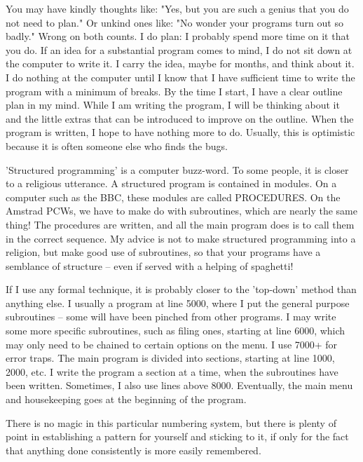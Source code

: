 You may have kindly thoughts like: "Yes, but you are such a genius that you do 
not  need to plan." Or unkind ones like: "No wonder your programs turn out  so 
badly." Wrong on both counts. I do plan: I probably spend more time on it that 
you do. If an idea for a substantial program comes to mind, I do not sit  down 
at  the  computer to write it. I carry the idea, maybe for months,  and  think 
about  it.  I do nothing at the computer until I know that I  have  sufficient 
time  to  write the program with a minimum of breaks. By the time I  start,  I 
have  a clear outline plan in my mind. While I am writing the program, I  will 
be  thinking about it and the little extras that can be introduced to  improve 
on  the outline. When the program is written, I hope to have nothing  more  to 
do. Usually, this is optimistic because it is often someone else who finds the 
bugs.

'Structured programming' is a computer buzz-word. To some people, it is closer 
to  a religious utterance. A structured program is contained in modules. On  a 
computer such as the BBC, these modules are called PROCEDURES. On the  Amstrad 
PCWs,  we have to make do with subroutines, which are nearly the  same  thing! 
The  procedures are written, and all the main program does is to call them  in 
the  correct sequence. My advice is not to make structured programming into  a 
religion,  but  make  good use of subroutines, so that your  programs  have  a 
semblance of structure -- even if served with a helping of spaghetti!

If I use any formal technique, it is probably closer to the 'top-down'  method 
than anything else. I usually a program at line 5000, where I put the  general 
purpose subroutines -- some will have been pinched from other programs. I  may 
write  some more specific subroutines, such as filing ones, starting  at  line 
6000, which may only need to be chained to certain options on the menu. I  use 
7000+ for error traps. The main program is divided into sections, starting  at 
line  1000,  2000,  etc. I write the program a section at  a  time,  when  the 
subroutines  have  been  written.  Sometimes, I also  use  lines  above  8000. 
Eventually,  the  main  menu and housekeeping goes at  the  beginning  of  the 
program.

There is no magic in this particular numbering system, but there is plenty  of 
point  in establishing a pattern for yourself and sticking to it, if only  for 
the fact that anything done consistently is more easily remembered.

